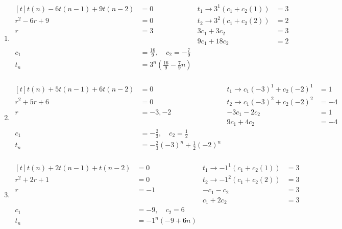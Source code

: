 \begin{enumerate}[leftmargin=2cm,labelsep=.5cm,label=\bf\arabic*.]
\begin{enumerate}
\item $
\begin{aligned}[t]
t(n) - 6t(n-1) + 9t(n-2) &= 0 & t_1 \rightarrow 3^1(c_1 + c_2(1)) &= 3 \\
r^2 - 6r + 9 &= 0             & t_2 \rightarrow 3^2(c_1 + c_2(2)) &= 2 \\
r &= 3                        & 3c_1 + 3c_2 &= 3 \\
&                             & 9c_1 + 18c_2 &= 2 \\[2mm]
c_1 &= \frac{16}{9}, \quad c_2 = -\frac{7}{9}  & & \\
t_n &= 3^n\left(\frac{16}{9} - \frac{7}{9}n\right) \\[2mm]
\end{aligned} $

\item $
\begin{aligned}[t]
t(n) + 5t(n-1) + 6t(n-2) &= 0 & t_1 \rightarrow c_1(-3)^1 + c_2(-2)^1 &= 1 \\
r^2 + 5r + 6 &= 0             & t_2 \rightarrow c_1(-3)^2 + c_2(-2)^2 &= -4 \\
r &= -3, -2                   & -3c_1 - 2c_2 &= 1 \\
&                             & 9c_1 + 4c_2 &= -4 \\[2mm]
c_1 &= -\frac{2}{3}, \quad c_2 = \frac{1}{2}  & & \\
t_n &= -\frac{2}{3}(-3)^n + \frac{1}{2}(-2)^n \\[2mm]
\end{aligned} $

\item $
\begin{aligned}[t]
t(n) + 2t(n-1) + t(n-2) &= 0  & t_1 \rightarrow -1^1(c_1 + c_2(1)) &= 3 \\
r^2 + 2r + 1 &= 0             & t_2 \rightarrow -1^2(c_1 + c_2(2)) &= 3 \\
r &= -1                       & -c_1 - c_2 &= 3 \\
&                             & c_1 + 2c_2 &= 3 \\[2mm]
c_1 &= -9, \quad c_2 = 6  & & \\
t_n &= -1^n(-9 + 6n) \\[2mm]
\end{aligned} $


\end{enumerate}
\end{enumerate}
